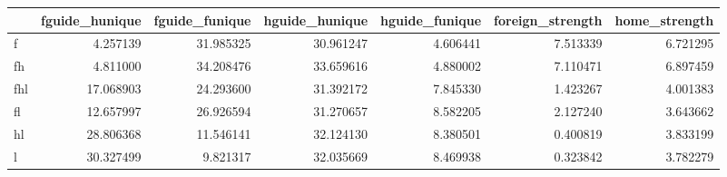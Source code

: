 \begin{tabular}{lrrrrrr}
\toprule
 & fguide_hunique & fguide_funique & hguide_hunique & hguide_funique & foreign_strength & home_strength \\
\midrule
f & 4.257139 & 31.985325 & 30.961247 & 4.606441 & 7.513339 & 6.721295 \\
fh & 4.811000 & 34.208476 & 33.659616 & 4.880002 & 7.110471 & 6.897459 \\
fhl & 17.068903 & 24.293600 & 31.392172 & 7.845330 & 1.423267 & 4.001383 \\
fl & 12.657997 & 26.926594 & 31.270657 & 8.582205 & 2.127240 & 3.643662 \\
hl & 28.806368 & 11.546141 & 32.124130 & 8.380501 & 0.400819 & 3.833199 \\
l & 30.327499 & 9.821317 & 32.035669 & 8.469938 & 0.323842 & 3.782279 \\
\bottomrule
\end{tabular}
